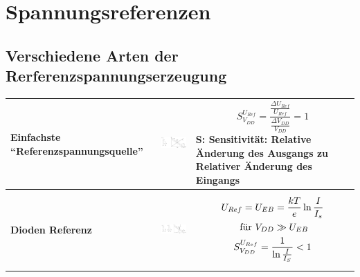 \section{Spannungsreferenzen} 

\subsection{Verschiedene Arten der Rerferenzspannungserzeugung} 
	\begin{longtable}{|l|l|l|}
	\hline
		\begin{minipage}{4cm}
			\textbf{Einfachste "`Referenzspannungsquelle"'}
		\end{minipage}
	&
		\begin{minipage}{6cm}
			\includegraphics[width=6cm,trim=0 0 0 -5]{images/spannungsteiler}
		\end{minipage}
	&
		\begin{minipage}{8cm}
			\begin{equation*}
				S_{V_{DD}}^{U_{Ref}}=\frac{\frac{\Delta
				U_{Ref}}{U_{Ref}}}{\frac{\Delta V_{DD}}{V_{DD}}}=1
			\end{equation*}
			S: Sensitivität: Relative Änderung des Ausgangs zu Relativer Änderung des Eingangs
		\end{minipage}
	\\ \hline
		\begin{minipage}{4cm}
			\textbf{Dioden Referenz}
		\end{minipage}
	&
		\begin{minipage}{6cm}
			\includegraphics[width=6cm]{images/diodenReferenz}
		\end{minipage}
	&
		\begin{minipage}{8cm}
			\begin{gather*}
				U_{Ref}=U_{EB}=\frac{kT}{e}\ln{\frac{I}{I_{s}}} \notag\\
				\text{ für }V_{DD} \gg U_{EB}\\
				S_{V_{DD}}^{U_{Ref}}=\frac{1}{\ln{\frac{I}{I_{S}}}}<1

\end{gather*}
\end{minipage}
\end{longtable}
